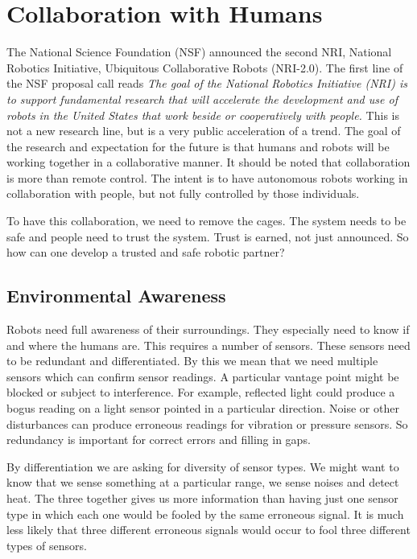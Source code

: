 \hypertarget{collaboration-with-humans}{%
\section{Collaboration with Humans}\label{collaboration-with-humans}}

The National Science Foundation (NSF) announced the second NRI, National
Robotics Initiative, Ubiquitous Collaborative Robots (NRI-2.0). The
first line of the NSF proposal call reads \emph{The goal of the National
Robotics Initiative (NRI) is to support fundamental research that will
accelerate the development and use of robots in the United States that
work beside or cooperatively with people.} This is not a new research
line, but is a very public acceleration of a trend. The goal of the
research and expectation for the future is that humans and robots will
be working together in a collaborative manner. It should be noted that
collaboration is more than remote control. The intent is to have
autonomous robots working in collaboration with people, but not fully
controlled by those individuals.

To have this collaboration, we need to remove the cages. The system
needs to be safe and people need to trust the system. Trust is earned,
not just announced. So how can one develop a trusted and safe robotic
partner?

\hypertarget{environmental-awareness}{%
\subsection{Environmental Awareness}\label{environmental-awareness}}

Robots need full awareness of their surroundings. They especially need
to know if and where the humans are. This requires a number of sensors.
These sensors need to be redundant and differentiated. By this we mean
that we need multiple sensors which can confirm sensor readings. A
particular vantage point might be blocked or subject to interference.
For example, reflected light could produce a bogus reading on a light
sensor pointed in a particular direction. Noise or other disturbances
can produce erroneous readings for vibration or pressure sensors. So
redundancy is important for correct errors and filling in gaps.

By differentiation we are asking for diversity of sensor types. We might
want to know that we sense something at a particular range, we sense
noises and detect heat. The three together gives us more information
than having just one sensor type in which each one would be fooled by
the same erroneous signal. It is much less likely that three different
erroneous signals would occur to fool three different types of sensors.

